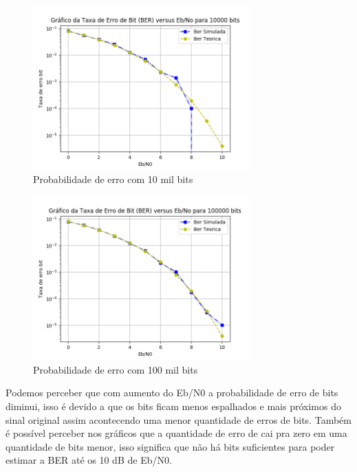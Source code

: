 \documentclass[12pt]{article}
\begin{document}
\FloatBarrier
\begin{figure}[h!]
\includegraphics[width=0.75\textwidth]{ber10mil.png}
    \caption{Probabilidade de erro com 10 mil bits}
    \label{fig:my_label}
\end{figure}
\FloatBarrier

\begin{figure}[h!]
\includegraphics[width=0.75\textwidth]{ber100mil.png}
    \caption{Probabilidade de erro com 100 mil bits}
    \label{fig:my_label}
\end{figure}
\FloatBarrier
Podemos perceber que com aumento do Eb/N0 a probabilidade de erro de bits diminui, isso é devido a que os bits ficam menos espalhados e mais próximos  do sinal original assim acontecendo uma menor quantidade de erros de bits. Também é possível perceber nos gráficos que a quantidade de erro de cai pra zero em uma quantidade de bits menor, isso significa que não há bits suficientes para poder estimar a BER até os 10 dB de Eb/N0.
\end{document}
